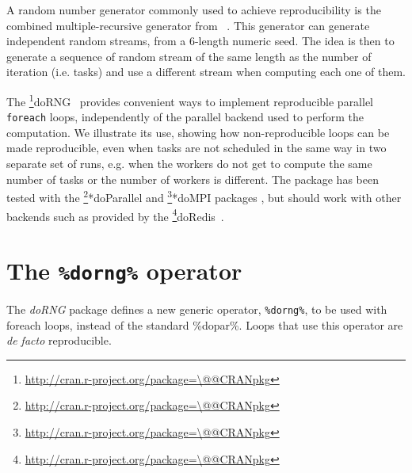 \documentclass[a4paper,12pt]{article}\usepackage{graphicx, color}
\makeatletter
\let\code=\texttt
\newcommand{\pkgname}[1]{\textit{#1}\xspace}
\newcommand{\Rpkg}[1]{\pkgname{#1} package\xspace}
\newcommand{\citepkg}[1]{\cite{#1}}
\newcommand{\CRANurl}[1]{\url{http://cran.r-project.org/package=#1}}
\def\CRANpkg{\@ifstar\@CRANpkg\@@CRANpkg}
\def\@CRANpkg#1{\href{http://cran.r-project.org/package=#1}{\pkgname{#1}}\footnote{\CRANurl{#1}}}
\def\@@CRANpkg#1{\href{http://cran.r-project.org/package=#1}{\pkgname{#1}} package\footnote{\CRANurl{#1}}}
\newcommand{\citeCRANpkg}[1]{\CRANpkg{#1}~\cite{#1}}
\newcommand{\citet}[1]{\citeauthor{#1}~\cite{#1}}
\makeatother
\begin{document}
A random number generator commonly used to achieve reproducibility is the
combined multiple-recursive generator from \citet{Lecuyer1999}.
This generator can generate independent random streams, from a 6-length numeric seed.
The idea is then to generate a sequence of random stream of the same length
as the number of iteration (i.e. tasks) and use a different stream when computing each
one of them.

The \citeCRANpkg{doRNG} provides convenient ways to implement reproducible
parallel \code{foreach} loops, independently of the parallel backend used to perform the computation.
We illustrate its use, showing how non-reproducible loops can be made
reproducible, even when tasks are not scheduled in the same way in two separate
set of runs, e.g.
when the workers do not get to compute the same number of tasks or the number of workers is different.
The package has been tested with the \CRANpkg*{doParallel} and \CRANpkg*{doMPI}
packages \citepkg{doMPI,doParallel}, but should work with other backends such as
provided by the \citeCRANpkg{doRedis}. 

\section{The \texttt{\%dorng\%} operator}

The \Rpkg{doRNG} defines a new generic operator, \code{\%dorng\%}, to be used
with foreach loops, instead of the standard {\%dopar\%}.
Loops that use this operator are \emph{de facto} reproducible.
\end{document}
